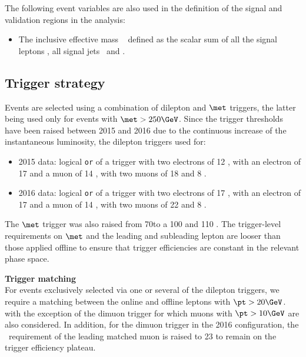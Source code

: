 The following event variables are also used in the definition of the signal and validation regions in the analysis:
\begin{itemize}
\item The inclusive effective mass \meff~ defined as the scalar sum of
  all the signal leptons \pt , all signal jets \pt\ and \met. 
\end{itemize}

\subsection{Trigger strategy}
\label{subsec:sec.strategy.sel.selection_trigger}
  
Events are selected using a combination of dilepton and $\met$ triggers, the latter being used only for events with $\met>250 \GeV$. 
Since the trigger thresholds have been raised between 2015 and 2016 due to the 
continuous increase of the instantaneous luminosity, 
the dilepton triggers used for: 
\begin{itemize}
\item 2015 data:
logical \texttt{or} of a trigger with two electrons of 12 \GeV, 
with an electron of 17 \GeV and a muon of 14 \GeV,
with two muons of 18 \GeV and 8 \GeV. 
\item 2016 data:
logical \texttt{or} of a trigger with two electrons of 17 \GeV, 
with an electron of 17 \GeV and a muon of 14 \GeV,
with two muons of 22 \GeV and 8 \GeV. 
\end{itemize}
The $\met$ trigger was also raised from 70\GeV to a 100 \GeV and 110 \GeV.
The trigger-level requirements on $\met$ and the leading and subleading lepton \pt are looser than those applied offline 
to ensure that trigger efficiencies are constant in the relevant phase space.


\par{\bfseries Trigger matching\\}
For events exclusively selected via one or several of the dilepton triggers, 
we require a matching between the online and offline leptons with $\pt>20 \GeV$.
with the exception of the dimuon trigger for which muons with $\pt>10 \GeV$ 
are also considered.
In addition, for the dimuon trigger in the 2016 configuration, 
the \pt\ requirement of the leading matched muon is raised to 23 \GeV 
to remain on the trigger efficiency plateau. 

